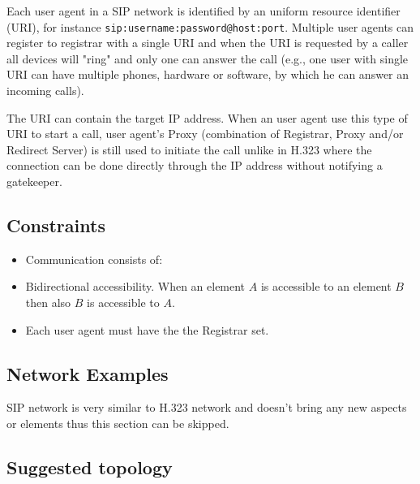 \documentclass[a4paper]{report}
\begin{document}
Each user agent in a SIP network is identified by an uniform resource identifier (URI), for instance \verb|sip:username:password@host:port|. Multiple user agents can register to registrar with a single URI and when the URI is requested by a caller all devices will "ring" and only one can answer the call (e.g., one user with single URI can have multiple phones, hardware or software, by which he can answer an incoming calls).

The URI can contain the target IP address. When an user agent use this type of URI to start a call, user agent's Proxy (combination of Registrar, Proxy and/or Redirect Server) is still used to initiate the call unlike in H.323 where the connection can be done directly through the IP address without notifying a gatekeeper.

\subsection{Constraints}

\begin{itemize}

\item Communication consists of:

\item Bidirectional accessibility. When an element $A$ is accessible to an element $B$ then also $B$ is accessible to $A$.

\item Each user agent must have the the Registrar set.

\end{itemize}

\subsection{Network Examples}

SIP network is very similar to H.323 network and doesn't bring any new aspects or elements thus this section can be skipped.

\subsection{Suggested topology}
\end{document}
